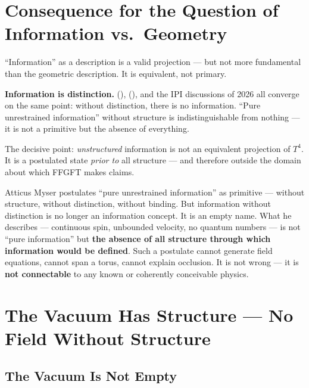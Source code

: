 \section{Consequence for the Question of Information vs.\ Geometry}

``Information'' as a description is a valid projection --- but not more fundamental than the geometric description. It is equivalent, not primary.

\begin{keyresult}
\textbf{Information is distinction.} \citeauthor{Shannon1948} (\citeyear{Shannon1948}), \citeauthor{Bateson1972} (\citeyear{Bateson1972}), and the IPI discussions of 2026 \cite{Kriger2026} all converge on the same point: without distinction, there is no information. ``Pure unrestrained information'' without structure is indistinguishable from nothing --- it is not a primitive but the absence of everything.
\end{keyresult}

The decisive point: \emph{unstructured} information is not an equivalent projection of $T^4$. It is a postulated state \emph{prior to} all structure --- and therefore outside the domain about which FFGFT makes claims.

\begin{erkenntnis}
Atticus Myser postulates ``pure unrestrained information'' as primitive --- without structure, without distinction, without binding. But information without distinction is no longer an information concept. It is an empty name. What he describes --- continuous spin, unbounded velocity, no quantum numbers --- is not ``pure information'' but \textbf{the absence of all structure through which information would be defined}. Such a postulate cannot generate field equations, cannot span a torus, cannot explain occlusion. It is not wrong --- it is \textbf{not connectable} to any known or coherently conceivable physics.
\end{erkenntnis}

\section{The Vacuum Has Structure --- No Field Without Structure}

\subsection{The Vacuum Is Not Empty}

